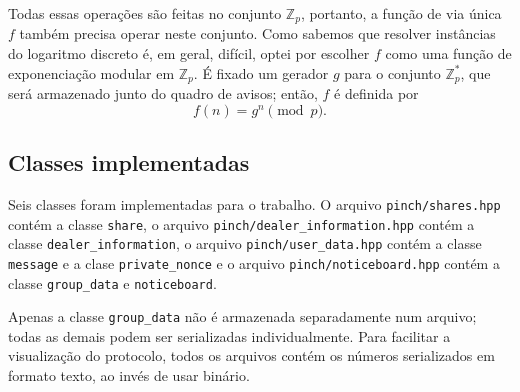 \documentclass[10pt,twocolumn]{article}
\begin{document}
Todas essas operações são feitas no conjunto $\mathbb Z_p$,
portanto, a função de via única $f$ também precisa operar neste conjunto.
Como sabemos que resolver instâncias do logaritmo discreto é,
em geral, difícil,
optei por escolher $f$ como uma função de exponenciação modular em $\mathbb Z_p$.
É fixado um gerador $g$ para o conjunto $\mathbb Z_p^*$,
que será armazenado junto do quadro de avisos;
então, $f$ é definida por
\begin{equation*}
    f(n) = g^n \pmod p.
\end{equation*}

\subsection{Classes implementadas}

Seis classes foram implementadas para o trabalho.
O arquivo \verb"pinch/shares.hpp" contém a classe \verb"share",
o arquivo \verb"pinch/dealer_information.hpp" contém a classe \verb"dealer_information",
o arquivo \verb"pinch/user_data.hpp" contém a classe \verb"message"
e a clase \verb"private_nonce"
e o arquivo \verb"pinch/noticeboard.hpp" contém a classe \verb"group_data"
e \verb"noticeboard".

Apenas a classe \verb"group_data" não é armazenada separadamente num arquivo;
todas as demais podem ser serializadas individualmente.
Para facilitar a visualização do protocolo,
todos os arquivos contém os números serializados em formato texto,
ao invés de usar binário.
\end{document}
